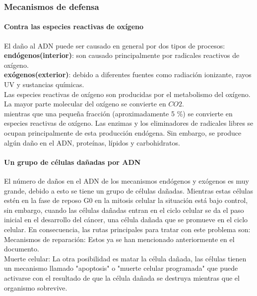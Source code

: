 

\subsubsection{Mecanismos de defensa}
\paragraph{Contra las especies reactivas de oxígeno}
El daño al ADN puede ser causado en general por dos tipos de procesos: \\
 \textbf{endógenos(interior)}: son causado principalmente por radicales reactivos de oxígeno.\\
 \textbf{exógenos(exterior)}: debido a diferentes fuentes como radiación ionizante, rayos UV y sustancias químicas.\\
Las especies reactivas de oxígeno son producidas por el metabolismo del oxígeno. La mayor parte molecular del oxígeno se convierte en $CO2$.\\
mientras que una pequeña fracción (aproximadamente 5 \%) se convierte en especies reactivas de oxígeno. Las enzimas y los eliminadores de radicales libres se ocupan principalmente de esta producción endógena. Sin embargo, se produce algún daño en el ADN, proteínas, lípidos y carbohidratos\cite{Thormod}.

\paragraph{Un grupo de células dañadas por ADN}

El número de daños en el ADN de los mecanismos endógenos y exógenos es muy grande, debido a esto se tiene un grupo de células dañadas. Mientras estas células estén en la fase de reposo G0 en la mitosis celular la situación está bajo control, sin embargo, cuando las células dañadas entran en el ciclo celular se da el paso inicial en el desarrollo del cáncer, una célula dañada que se promueve en el ciclo celular. En consecuencia, las rutas principales para tratar con este problema son: \\
Mecanismos de reparación: Estos ya se han mencionado anteriormente en el documento.\\
Muerte celular: La otra posibilidad es matar la célula dañada, las células tienen un mecanismo llamado "apoptosis" o "muerte celular programada" que puede activarse con el resultado de que la célula dañada se destruya mientras que el organismo sobrevive\cite{Thormod}.

